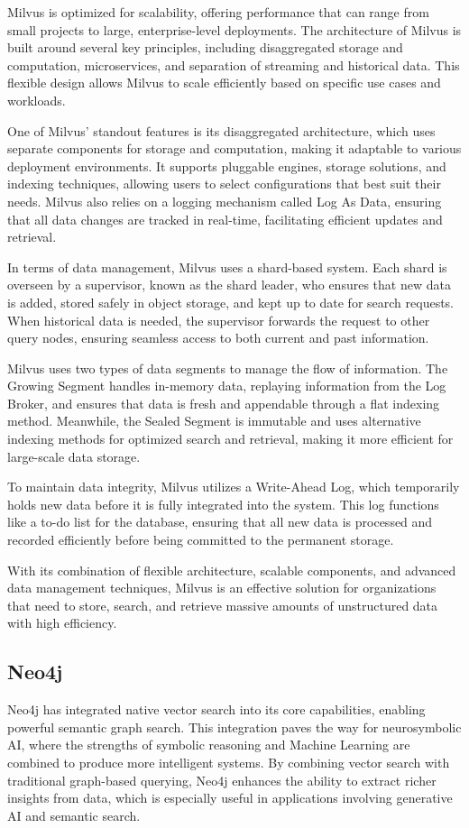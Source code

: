 Milvus is optimized for scalability, offering performance that can range from small projects to large, enterprise-level deployments. 
The architecture of Milvus is built around several key principles, including disaggregated storage and computation, microservices, and separation of streaming and historical data. 
This flexible design allows Milvus to scale efficiently based on specific use cases and workloads.

One of Milvus' standout features is its disaggregated architecture, which uses separate components for storage and computation, making it adaptable to various deployment environments. 
It supports pluggable engines, storage solutions, and indexing techniques, allowing users to select configurations that best suit their needs. 
Milvus also relies on a logging mechanism called Log As Data, ensuring that all data changes are tracked in real-time, facilitating efficient updates and retrieval.

In terms of data management, Milvus uses a shard-based system. 
Each shard is overseen by a supervisor, known as the shard leader, who ensures that new data is added, stored safely in object storage, and kept up to date for search requests. 
When historical data is needed, the supervisor forwards the request to other query nodes, ensuring seamless access to both current and past information.

Milvus uses two types of data segments to manage the flow of information. 
The Growing Segment handles in-memory data, replaying information from the Log Broker, and ensures that data is fresh and appendable through a flat indexing method.
Meanwhile, the Sealed Segment is immutable and uses alternative indexing methods for optimized search and retrieval, making it more efficient for large-scale data storage.

To maintain data integrity, Milvus utilizes a Write-Ahead Log, which temporarily holds new data before it is fully integrated into the system. 
This log functions like a to-do list for the database, ensuring that all new data is processed and recorded efficiently before being committed to the permanent storage.

With its combination of flexible architecture, scalable components, and advanced data management techniques, Milvus is an effective solution for organizations that need to store, search, and retrieve massive amounts of unstructured data with high efficiency.



\subsection{Neo4j}
Neo4j has integrated native vector search into its core capabilities, enabling powerful semantic graph search. 
This integration paves the way for neurosymbolic AI, where the strengths of symbolic reasoning and Machine Learning are combined to produce more intelligent systems.
By combining vector search with traditional graph-based querying, Neo4j enhances the ability to extract richer insights from data, which is especially useful in applications involving generative AI and semantic search.

